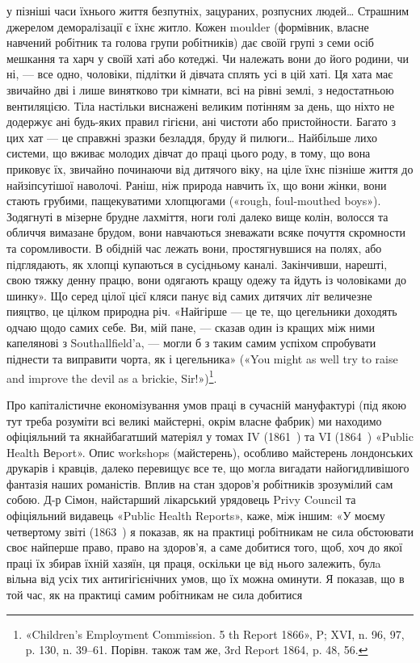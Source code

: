 \parcont{}  %
у пізніші часи їхнього життя безпутніх, зацураних, розпусних
людей\dots{} Страшним джерелом деморалізації є їхнє житло. Кожен
moulder (формівник, власне навчений робітник та голова групи
робітників) дає своїй групі з семи осіб мешкання та харч у своїй
хаті або котеджі. Чи належать вони до його родини, чи ні, — все
одно, чоловіки, підлітки й дівчата сплять усі в цій хаті. Ця хата
має звичайно дві і лише винятково три кімнати, всі на рівні землі,
з недостатньою вентиляцією. Тіла настільки виснажені великим
потінням за день, що ніхто не додержує ані будь-яких правил
гігієни, ані чистоти або пристойности. Багато з цих хат — це
справжні зразки безладдя, бруду й пилюги\dots{} Найбільше лихо
системи, що вживає молодих дівчат до праці цього роду, в тому,
що вона приковує їх, звичайно починаючи від дитячого віку, на
ціле їхнє пізніше життя до найзіпсутішої наволочі. Раніш, ніж
природа навчить їх, що вони жінки, вони стають грубими, пащекуватими
хлопцюгами («rough, foul-mouthed boys»). Зодягнуті
в мізерне брудне лахміття, ноги голі далеко вище колін, волосся
та обличчя вимазане брудом, вони навчаються зневажати всяке
почуття скромности та соромливости. В обідній час лежать вони,
простягнувшися на полях, або підглядають, як хлопці купаються
в сусідньому каналі. Закінчивши, нарешті, свою тяжку денну
працю, вони одягають кращу одежу та йдуть із чоловіками до
шинку». Що серед цілої цієї кляси панує від самих дитячих літ
величезне пияцтво, це цілком природна річ. «Найгірше — це те,
що цегельники доходять одчаю щодо самих себе. Ви, мій пане, —
сказав один із кращих між ними капелянові з Southallfield’a, —
могли б з таким самим успіхом спробувати піднести та виправити
чорта, як і цегельника» («You might as well try to raise and
improve the devil as a brickie, Sir!»)\footnote{
«Children’s Employment Commission. 5 th Report 1866», P; XVІ,
n. 96, 97, p. 130, n. 39--61. Порівн. також там же, 3rd Report 1864,
p. 48, 56.
}.

Про капіталістичне економізування умов праці в сучасній
мануфактурі (під якою тут треба розуміти всі великі майстерні,
окрім власне фабрик) ми находимо офіціяльний та якнайбагатший
матеріял у томах IV (1861~) та VI (1864~) «Public Health Веport».
Опис workshops (майстерень), особливо майстерень лондонських
друкарів і кравців, далеко перевищує все те, що могла вигадати
найогидливішого фантазія наших романістів. Вплив на
стан здоров’я робітників зрозумілий сам собою. Д-р Сімон, найстарший
лікарський урядовець Privy Council та офіціяльний
видавець «Public Health Reports», каже, між іншим: «У моєму
четвертому звіті (1863~) я показав, як на практиці робітникам
не сила обстоювати своє найперше право, право на здоров’я,
а саме добитися того, щоб, хоч до якої праці їх збирав їхній хазяїн,
ця праця, оскільки це від нього залежить, булa вільна від
усіх тих антигігієнічних умов, що їх можна оминути. Я показав,
що в той час, як на практиці самим робітникам не сила добитися
\parbreak{}  %
